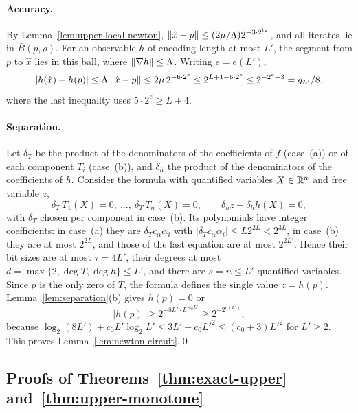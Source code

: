 \paragraph{Accuracy.}
By Lemma~\ref{lem:upper-local-newton},
$\left\lVert\hat x-p\right\rVert\le(2\mu/\Lambda)2^{-3\cdot2^{t_*}}$, and all iterates lie in
$\bar B(p,\rho)$. For an observable $h$ of encoding length at most $L'$, the
segment from $p$ to $\hat x$ lies in this ball, where
$\left\lVert\nabla h\right\rVert\le\Lambda$. Writing $e=e(L')$,
\[
 |h(\hat x)-h(p)|\le\Lambda\left\lVert\hat x-p\right\rVert\le2\mu\,2^{-6\cdot2^e}
 \le2^{L+1-6\cdot2^e}\le2^{-2^e-3}=g_{L'}/8,
\]
where the last inequality uses $5\cdot2^e\ge L+4$.

\paragraph{Separation.}
Let $\delta_T$ be the product of the denominators of the coefficients of $f$
(case~(a)) or of each component $T_i$ (case~(b)), and $\delta_h$ the product
of the denominators of the coefficients of $h$. Consider the formula with
quantified variables $X\in\mathbb R^n$ and free variable $z$,
\[
 \delta_T\,T_1(X)=0,\ \ldots,\ \delta_T\,T_n(X)=0,\qquad
 \delta_hz-\delta_hh(X)=0,
\]
with $\delta_T$ chosen per component in case~(b). Its polynomials have integer
coefficients: in case~(a) they are $\delta_Tc_\alpha\alpha_i$ with
$|\delta_Tc_\alpha\alpha_i|\le L2^{2L}<2^{3L}$, in case~(b) they are at most
$2^{2L}$, and those of the last equation are at most $2^{2L'}$. Hence their
bit sizes are at most $\tau=4L'$, their degrees at most
$d=\max\{2,\deg T,\deg h\}\le L'$, and there are $s=n\le L'$ quantified
variables. Since $p$ is the only zero of $T$, the formula defines the single
value $z=h(p)$. Lemma~\ref{lem:separation}(b) gives $h(p)=0$ or
\[
 |h(p)|\ge2^{-8L'\cdot L'^{c_0L'}}\ge2^{-2^{e(L')}},
\]
because $\log_2(8L')+c_0L'\log_2L'\le3L'+c_0L'^2\le(c_0+3)L'^2$ for
$L'\ge2$. This proves Lemma~\ref{lem:newton-circuit}.\qed

\subsection{Proofs of Theorems~\ref{thm:exact-upper} and~\ref{thm:upper-monotone}}
\label{app:upper-convex-proof}

